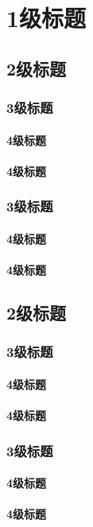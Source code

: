 \chapter{1级标题}
\section{2级标题}
\subsection{3级标题}
\subsubsection{4级标题}
\subsubsection{4级标题}
\subsection{3级标题}
\subsubsection{4级标题}
\subsubsection{4级标题}
\section{2级标题}
\subsection{3级标题}
\subsubsection{4级标题}
\subsubsection{4级标题}
\subsection{3级标题}
\subsubsection{4级标题}
\subsubsection{4级标题}

